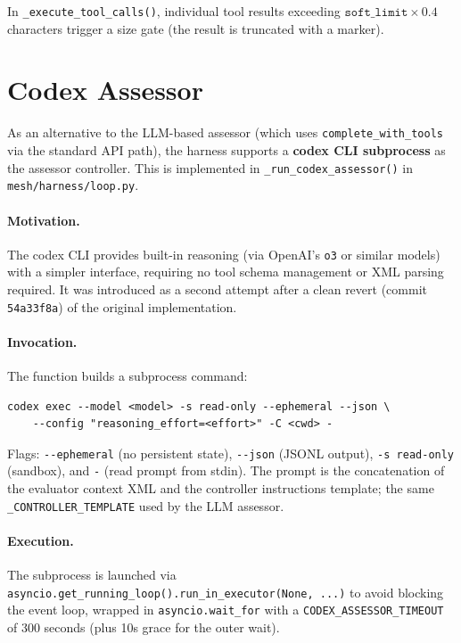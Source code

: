 \documentclass[11pt,letterpaper]{report}
\newcommand{\code}[1]{\texttt{#1}}
\begin{document}
In \code{\_execute\_tool\_calls()}, individual tool
results exceeding $\texttt{soft\_limit} \times 0.4$ characters trigger
a size gate (the result is truncated with a marker).


\section{Codex Assessor}
\label{sec:codex-assessor}

As an alternative to the LLM-based assessor (which uses
\code{complete\_with\_tools} via the standard API path), the harness
supports a \textbf{codex CLI subprocess} as the assessor controller.
This is implemented in \code{\_run\_codex\_assessor()} in
\code{mesh/harness/loop.py}.

\paragraph{Motivation.}
The codex CLI provides built-in reasoning (via OpenAI's \code{o3} or
similar models) with a simpler interface, requiring no tool schema management or
XML parsing required. It was introduced as a second attempt after a
clean revert (commit \code{54a33f8a}) of the original implementation.

\paragraph{Invocation.}
The function builds a subprocess command:
\begin{lstlisting}[numbers=none]
codex exec --model <model> -s read-only --ephemeral --json \
    --config "reasoning_effort=<effort>" -C <cwd> -
\end{lstlisting}
Flags: \code{-{}-ephemeral} (no persistent state), \code{-{}-json}
(JSONL output), \code{-s read-only} (sandbox), and \code{-} (read
prompt from stdin). The prompt is the concatenation of the evaluator
context XML and the controller instructions template; the same
\code{\_CONTROLLER\_TEMPLATE} used by the LLM assessor.

\paragraph{Execution.}
The subprocess is launched via \code{asyncio.get\_running\_loop().run\_in\_executor(None, ...)}
to avoid blocking the event loop, wrapped in \code{asyncio.wait\_for}
with a \code{CODEX\_ASSESSOR\_TIMEOUT} of 300 seconds (plus 10s grace
for the outer wait).
\end{document}
